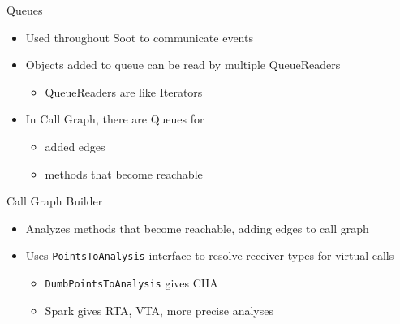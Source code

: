 \begin{slide}{Queues}
\begin{itemize}
\item Used throughout Soot to communicate events
\item Objects added to queue can be read by multiple QueueReaders
\begin{itemize}
\item QueueReaders are like Iterators
\end{itemize}
\item In Call Graph, there are Queues for
\begin{itemize}
\item added edges
\item methods that become reachable
\end{itemize}
\end{itemize}
\end{slide}

\begin{slide}{Call Graph Builder}
\begin{itemize}
\item Analyzes methods that become reachable, adding edges
to call graph
\item Uses {\tt PointsToAnalysis} interface to resolve receiver
types for virtual calls
\begin{itemize}
\item {\tt DumbPointsToAnalysis} gives CHA
\item Spark gives RTA, VTA, more precise analyses
\end{itemize}
\end{itemize}
\end{slide}


